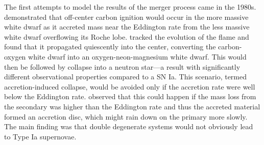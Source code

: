 \documentclass[iop]{../emulateapj}
\begin{document}
The first attempts to model the results of the merger process came in the
1980s. \cite{nomotoiben:1985} demonstrated that off-center carbon
ignition would occur in the more massive white dwarf as it accreted
mass near the Eddington rate from the less massive white dwarf
overflowing its Roche lobe. \cite{saionomoto:1985} tracked the
evolution of the flame and found that it propagated quiescently into
the center, converting the carbon-oxygen white dwarf into an
oxygen-neon-magnesium white dwarf. This would then be followed by
collapse into a neutron star---a result with significantly different
observational properties compared to a SN Ia. This scenario, termed
accretion-induced collapse, would be avoided only if the accretion
rate were well below the Eddington rate. \cite{tutukov_yungelson:1979}
observed that this could happen if the mass loss from the secondary
was higher than the Eddington rate and thus the accreted material
formed an accretion disc, which might rain down on the primary more
slowly. The main finding was that double degenerate systems would not
obviously lead to Type Ia supernovae.
\end{document}
